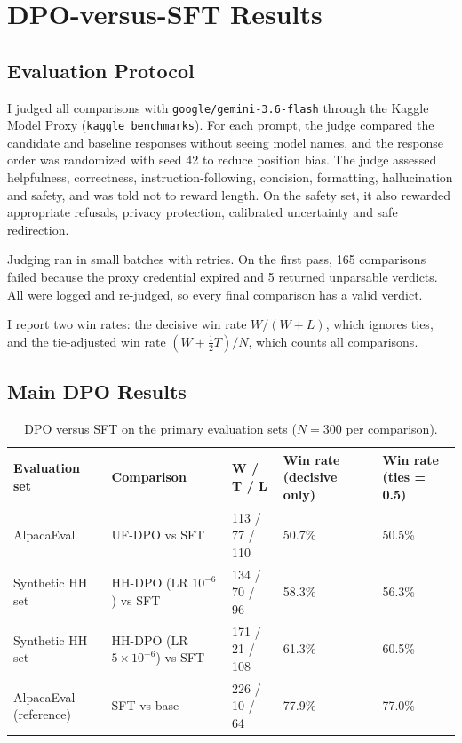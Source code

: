 \documentclass[10pt,a4paper]{article}
\newcommand{\code}[1]{\texttt{#1}}
\begin{document}
\section{DPO-versus-SFT Results}

\subsection{Evaluation Protocol}

I judged all comparisons with \code{google/gemini-3.6-flash} through the Kaggle Model Proxy (\code{kaggle\_benchmarks}). For each prompt, the judge compared the candidate and baseline responses without seeing model names, and the response order was randomized with seed 42 to reduce position bias. The judge assessed helpfulness, correctness, instruction-following, concision, formatting, hallucination and safety, and was told not to reward length. On the safety set, it also rewarded appropriate refusals, privacy protection, calibrated uncertainty and safe redirection.

Judging ran in small batches with retries. On the first pass, 165 comparisons failed because the proxy credential expired and 5 returned unparsable verdicts. All were logged and re-judged, so every final comparison has a valid verdict.

I report two win rates: the decisive win rate $W/(W+L)$, which ignores ties, and the tie-adjusted win rate $(W+\tfrac12 T)/N$, which counts all comparisons.

\subsection{Main DPO Results}

\begin{table}[!htb]
\centering\small
\caption{DPO versus SFT on the primary evaluation sets ($N=300$ per comparison).}
\label{tab:main-results}
\begin{tabularx}{\textwidth}{@{}p{3.0cm}YC{2.3cm}C{2.0cm}C{2.0cm}@{}}
\toprule
Evaluation set & Comparison & W / T / L & Win rate (decisive only) & Win rate (ties = 0.5) \\
\midrule
AlpacaEval & UF-DPO vs SFT & 113 / 77 / 110 & 50.7\% & 50.5\% \\
Synthetic HH set & HH-DPO (LR $10^{-6}$) vs SFT & 134 / 70 / 96 & 58.3\% & 56.3\% \\
Synthetic HH set & HH-DPO (LR $5\times10^{-6}$) vs SFT & 171 / 21 / 108 & 61.3\% & 60.5\% \\
\midrule
AlpacaEval (reference) & SFT vs base & 226 / 10 / 64 & 77.9\% & 77.0\% \\
\bottomrule
\end{tabularx}
\end{table}
\end{document}
